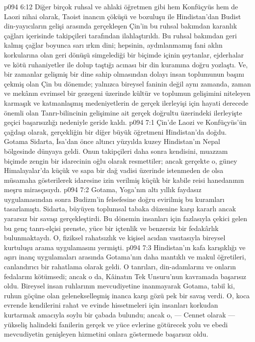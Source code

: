 \vs p094 6:12 Diğer birçok ruhsal ve ahlaki öğretmen gibi hem Konfüçyüs hem de Laozi nihai olarak, Taoist inancın çöküşü ve bozuluşu ile Hindistan’dan Budist din\hyp{}yayıcıların gelişi arasında gerçekleşen Çin’in bu ruhsal bakımdan karanlık çağları içerisinde takipçileri tarafından ilahlaştırıldı. Bu ruhsal bakımdan geri kalmış çağlar boyunca sarı ırkın dini; hepsinin, aydınlanmamış fani aklın korkularına olan geri dönüşü simgelediği bir biçimde içinin şeytanlar, ejderhalar ve kötü ruhaniyetler ile dolup taştığı acınası bir din kuramına doğru yozlaştı. Ve, bir zamanlar gelişmiş bir dine sahip olmasından dolayı insan toplumunun başını çekmiş olan Çin bu dönemde; yalnızca bireysel faninin değil aynı zamanda, zaman ve mekânın evrimsel bir gezegeni üzerinde kültür ve toplumun gelişimini niteleyen karmaşık ve katmanlaşmış medeniyetlerin de gerçek ilerleyişi için hayati derecede önemli olan Tanrı\hyp{}bilincinin gelişimine ait gerçek doğrultu üzerindeki ilerleyişte geçici başarısızlığı nedeniyle geride kaldı.
\vs p094 7:1 Çin’de Laozi ve Konfüçyüs’ün çağdaşı olarak, gerçekliğin bir diğer büyük öğretmeni Hindistan’da doğdu. Gotama Sidarta, İsa’dan önce altıncı yüzyılda kuzey Hindistan’ın Nepal bölgesinde dünyaya geldi. Onun takipçileri daha sonra kendisini, muazzam biçimde zengin bir idarecinin oğlu olarak resmettiler; ancak gerçekte o, güney Himalayalar’da küçük ve sapa bir dağ vadisi üzerinde istenmeden de olsa müsamaha gösterilerek idaresine izin verilmiş küçük bir kabile reisi hanedanının meşru mirasçısıydı.
\vs p094 7:2 Gotama, Yoga’nın altı yıllık faydasız uygulamasından sonra Budizm’in felsefesine doğru evirilmiş bu kuramları tasarlamıştı. Sidarta, büyüyen toplumsal tabaka düzenine karşı kararlı ancak yararsız bir savaşı gerçekleştirdi. Bu dönemin insanları için fazlasıyla çekici gelen bu genç tanrı\hyp{}elçisi prenste, yüce bir içtenlik ve benzersiz bir fedakârlık bulunmaktaydı. O, fiziksel rahatsızlık ve kişisel acıdan vasıtasıyla bireysel kurtuluşu arama uygulamasını yermişti.
\vs p094 7:3 Hindistan’ın kafa karışıklığı ve aşırı inanç uygulamaları arasında Gotama’nın daha mantıklı ve makul öğretileri, canlandırıcı bir rahatlama olarak geldi. O tanrıları, din\hyp{}adamlarını ve onların fedalarını kötümsedi; ancak o da, Kâinatın Tek Unsuru’nun  kavramada başarısız oldu. Bireysel insan ruhlarının mevcudiyetine inanmayarak Gotama, tabiî ki, ruhun göçüne olan gelenekselleşmiş inanca karşı gözü pek bir savaş verdi. O, koca evrende kendilerini rahat ve evinde hissetmeleri için insanları korkudan kurtarmak amacıyla soylu bir çabada bulundu; ancak o, --- Cennet olarak --- yükseliş halindeki fanilerin gerçek ve yüce evlerine götürecek yolu ve ebedi mevcudiyetin genişleyen hizmetini onlara göstermede başarısız oldu.
